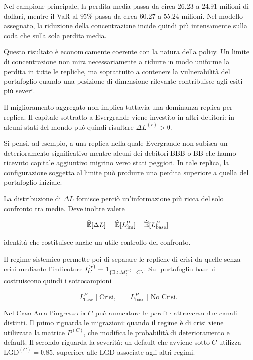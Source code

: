 Nel campione principale, la perdita media passa da circa $26.23$ a $24.91$
milioni di dollari, mentre il VaR al $95\%$ passa da circa $60.27$ a
$55.24$ milioni. Nel modello assegnato, la riduzione della concentrazione
incide quindi pi\`u intensamente sulla coda che sulla sola perdita media.

Questo risultato \`e economicamente coerente con la natura della policy. Un
limite di concentrazione non mira necessariamente a ridurre in modo uniforme
la perdita in tutte le repliche, ma soprattutto a contenere la vulnerabilit\`a
del portafoglio quando una posizione di dimensione rilevante contribuisce
agli esiti pi\`u severi.

Il miglioramento aggregato non implica tuttavia una dominanza replica per replica. Il capitale sottratto a Evergrande viene investito in altri
debitori: in alcuni stati del mondo pu\`o quindi risultare
$\Delta L^{(r)}>0$.

Si pensi, ad esempio, a una replica nella quale Evergrande non subisca un
deterioramento significativo mentre alcuni dei debitori BBB o BB che hanno
ricevuto capitale aggiuntivo migrino verso stati peggiori. In tale replica,
la configurazione soggetta al limite pu\`o produrre una perdita superiore a
quella del portafoglio iniziale.

La distribuzione di $\Delta L$ fornisce perci\`o un'informazione pi\`u ricca
del solo confronto tra medie. Deve inoltre valere

\[
\widehat{\mathbb{E}}[\Delta L]
=
\widehat{\mathbb{E}}[L_{\mathrm{lim}}^P]
-
\widehat{\mathbb{E}}[L_{\mathrm{base}}^P],
\]

\noindent identit\`a che costituisce anche un utile controllo del confronto.

Il regime sistemico permette poi di separare le repliche di crisi da quelle
senza crisi mediante l'indicatore
$I_C^{(r)}=\mathbf{1}_{\{\exists\,t:M_t^{(r)}=C\}}$. Sul portafoglio base si
costruiscono quindi i sottocampioni

\[
L_{\mathrm{base}}^P\mid\text{Crisi},
\qquad
L_{\mathrm{base}}^P\mid\text{No Crisi}.
\]

Nel Caso Aula l'ingresso in $C$ pu\`o aumentare le perdite attraverso due
canali distinti. Il primo riguarda le migrazioni: quando il regime \`e di
crisi viene utilizzata la matrice $P^{(C)}$, che modifica le probabilit\`a
di deterioramento e default. Il secondo riguarda la severit\`a: un default
che avviene sotto $C$ utilizza $\mathrm{LGD}^{(C)}=0.85$, superiore
alle $\mathrm{LGD}$ associate agli altri regimi.

